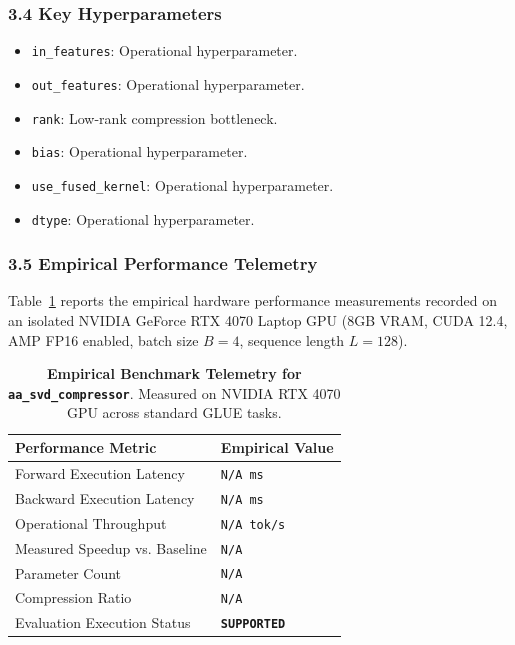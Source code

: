 \subsubsection*{3.4 Key Hyperparameters}
\begin{itemize}
    \item \texttt{in\_features}: Operational hyperparameter.
    \item \texttt{out\_features}: Operational hyperparameter.
    \item \texttt{rank}: Low-rank compression bottleneck.
    \item \texttt{bias}: Operational hyperparameter.
    \item \texttt{use\_fused\_kernel}: Operational hyperparameter.
    \item \texttt{dtype}: Operational hyperparameter.
\end{itemize}

\subsubsection*{3.5 Empirical Performance Telemetry}
Table~\ref{tab:telemetry_aa_svd_compressor} reports the empirical hardware performance measurements recorded on an isolated NVIDIA GeForce RTX 4070 Laptop GPU (8GB VRAM, CUDA 12.4, AMP FP16 enabled, batch size $B=4$, sequence length $L=128$).

\begin{table}[h]
\centering
\small
\caption{\textbf{Empirical Benchmark Telemetry for \texttt{aa\_svd\_compressor}}. Measured on NVIDIA RTX 4070 GPU across standard GLUE tasks.}
\label{tab:telemetry_aa_svd_compressor}
\begin{tabularx}{\columnwidth}{lX}
\toprule
\textbf{Performance Metric} & \textbf{Empirical Value} \\
\midrule
Forward Execution Latency & \texttt{N/A ms} \\
Backward Execution Latency & \texttt{N/A ms} \\
Operational Throughput & \texttt{N/A tok/s} \\
Measured Speedup vs. Baseline & \texttt{N/A} \\
Parameter Count & \texttt{N/A} \\
Compression Ratio & \texttt{N/A} \\
Evaluation Execution Status & \textbf{\texttt{SUPPORTED}} \\
\bottomrule
\end{tabularx}
\end{table}

